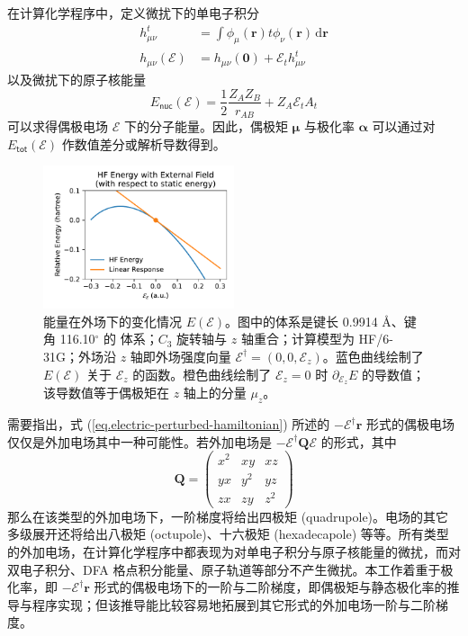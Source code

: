 在计算化学程序中，定义微扰下的单电子积分
\begin{align}
  h_{\mu \nu}^{t} &= \int \phi_\mu (\bm{r}) t \phi_\nu (\bm{r}) \, \mathrm{d} \bm{r} \\
  h_{\mu \nu} (\pmb{\mathcal{E}}) &= h_{\mu \nu} (\bm{0}) + \mathcal{E}_t h_{\mu \nu}^t
\end{align}
以及微扰下的原子核能量
\begin{equation}
  E_\textsf{nuc} (\pmb{\mathcal{E}}) = \frac{1}{2} \frac{Z_A Z_B}{r_{AB}} + Z_A \mathcal{E}_t A_t
\end{equation}
可以求得偶极电场 $\pmb{\mathcal{E}}$ 下的分子能量。因此，偶极矩 $\bm{\mu}$ 与极化率 $\bm{\alpha}$ 可以通过对 $E_\textsf{tot} (\pmb{\mathcal{E}})$ 作数值差分或解析导数得到。

\begin{figure}
  \centering
  \caption{能量在外场下的变化情况 $E(\pmb{\mathcal{E}})$。图中的体系是键长 0.9914 \AA、键角 116.10$^\circ$ 的  体系；$C_3$ 旋转轴与 $z$ 轴重合；计算模型为 HF/6-31G；外场沿 $z$ 轴即外场强度向量 $\pmb{\mathcal{E}}^\dagger = (0, 0, \mathcal{E}_z)$。蓝色曲线绘制了 $E(\pmb{\mathcal{E}})$ 关于 $\mathcal{E}_z$ 的函数。橙色曲线绘制了 $\mathcal{E}_z = 0$ 时 $\partial_{\mathcal{E}_z} E$ 的导数值；该导数值等于偶极矩在 $z$ 轴上的分量 $\mu_z$。}
  \label{fig.NumDipole-z}
  \includegraphics[width=0.5\textwidth]{assets/NumDipole-z.pdf}
\end{figure}

需要指出，式 (\ref{eq.electric-perturbed-hamiltonian}) 所述的 $- \pmb{\mathcal{E}}^\dagger \bm{r}$ 形式的偶极电场仅仅是外加电场其中一种可能性。若外加电场是 $- \pmb{\mathcal{E}}^\dagger \bm{Q} \pmb{\mathcal{E}}$ 的形式，其中
\begin{equation*}
  \bm{Q} =
  \begin{pmatrix}
    x^2 & xy & xz \\
    yx & y^2 & yz \\
    zx & zy & z^2
  \end{pmatrix}
\end{equation*}
那么在该类型的外加电场下，一阶梯度将给出四极矩 (quadrupole)。电场的其它多级展开还将给出八极矩 (octupole)、十六极矩 (hexadecapole) 等等。所有类型的外加电场，在计算化学程序中都表现为对单电子积分与原子核能量的微扰，而对双电子积分、DFA 格点积分能量、原子轨道等部分不产生微扰。本工作着重于极化率，即 $- \pmb{\mathcal{E}}^\dagger \bm{r}$ 形式的偶极电场下的一阶与二阶梯度，即偶极矩与静态极化率的推导与程序实现；但该推导能比较容易地拓展到其它形式的外加电场一阶与二阶梯度。

